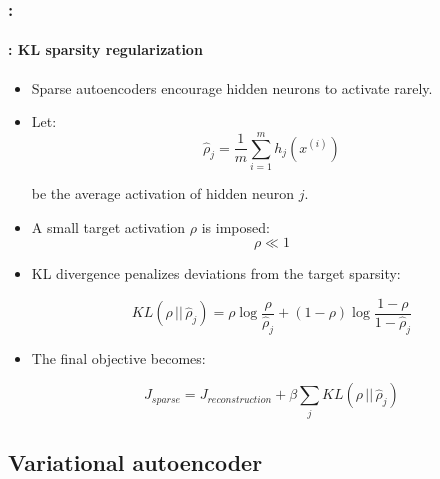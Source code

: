 \documentclass[xcolor=table]{beamer}
\begin{document}
	\begin{frame}
		\frametitle{\insertshortsubtitle: \insertsection}
		\framesubtitle{\insertsubsection: KL sparsity regularization}
		
		\begin{itemize}
			\item Sparse autoencoders encourage hidden neurons to activate rarely.
			
			\item Let:
			\[
			\hat{\rho}_j
			=
			\frac{1}{m}\sum_{i=1}^{m} h_j(x^{(i)})
			\]
			
			be the average activation of hidden neuron $j$.
			
			\item A small target activation $\rho$ is imposed:
			\[
			\rho \ll 1
			\]
			
			\item KL divergence penalizes deviations from the target sparsity:
			
			\[
			KL(\rho \,||\, \hat{\rho}_j)
			=
			\rho \log \frac{\rho}{\hat{\rho}_j}
			+
			(1-\rho)\log\frac{1-\rho}{1-\hat{\rho}_j}
			\]
			
			\item The final objective becomes:
			
			\[
			J_{sparse}
			=
			J_{reconstruction}
			+
			\beta \sum_j KL(\rho \,||\, \hat{\rho}_j)
			\]
			
		\end{itemize}
		
	\end{frame}
	
	\subsection{Variational autoencoder}
	
\end{document}
